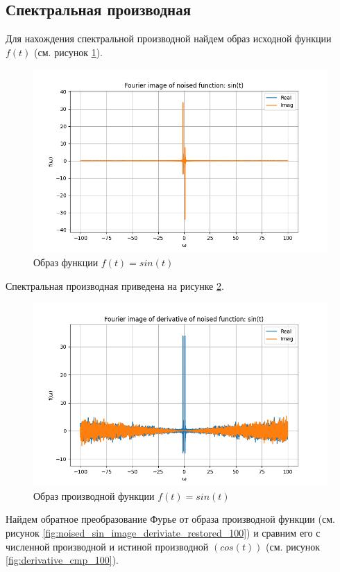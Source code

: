 \FloatBarrier
\subsection{Спектральная производная}
Для нахождения спектральной производной найдем образ исходной функции $f(t)$ (см. рисунок \ref{fig:noised_sin_image_100}). 
\begin{figure}[ht!]
    \centering
    \includegraphics[width=\textwidth]{../results/100/noised_sin_image.png}
    \caption{Образ функции $f(t) = sin(t)$}
    \label{fig:noised_sin_image_100}
\end{figure}
Спектральная производная приведена на рисунке \ref{fig:noised_sin_image_deriviate_100}.

\begin{figure}[ht!]
    \centering
    \includegraphics[width=\textwidth]{../results/100/noised_sin_image_derivative.png}
    \caption{Образ производной функции $f(t) = sin(t)$}
    \label{fig:noised_sin_image_deriviate_100}
\end{figure}
Найдем обратное преобразование Фурье от образа производной функции (см. рисунок \ref{fig:noised_sin_image_deriviate_restored_100}) и сравним его с численной производной и истиной производной $(cos(t))$ (см. рисунок \ref{fig:derivative_cmp_100}).

